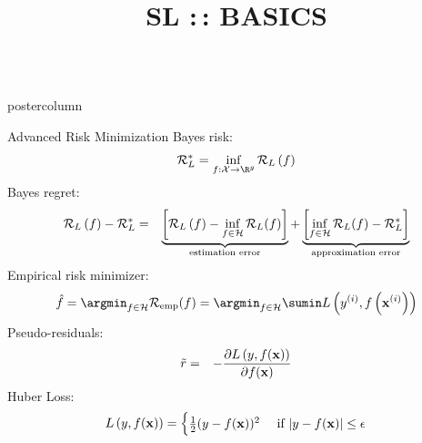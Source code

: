 \documentclass{beamer}
\title{SL :\,: BASICS} %
\newlength{\columnheight} %
\begin{document}
	\begin{frame}[fragile]{}
		\vspace{-8ex}
		\begin{columns}
			\begin{column}{.31\textwidth}
				\begin{beamercolorbox}[center]{postercolumn}
					\begin{minipage}{.98\textwidth}
						\parbox[t][\columnheight]{\textwidth}{
							\begin{myblock}{Advanced Risk Minimization}
								Bayes risk:
								\begin{eqnarray*}
									\riskbayes_{L} = \inf_{f: \Xspace \to \R^g} \risk_L\left(f\right) 
								\end{eqnarray*}
								Bayes regret:
								{\small
								\begin{eqnarray*}
									\mathcal{R}_L\left(f \right) - \mathcal{R}^\ast_{L} &=& \underbrace{\left[\mathcal{R}_L\left( f \right) - \inf_{f \in \mathcal{H}} \mathcal{R}_L(f)\right]}_{\text{estimation error}} + \underbrace{\left[\inf_{f \in \mathcal{H}} \mathcal{R}_L(f) - \mathcal{R}^\ast_{L}\right]}_{\text{approximation error}}
								\end{eqnarray*}}
								Empirical risk minimizer:
								\begin{eqnarray*}
									\hat f = \argmin_{f \in \Hspace} \riskef = \argmin_{f \in \Hspace} \sumin \Lxyi
								\end{eqnarray*}
								Pseudo-residuals:
								\vspace*{-0.3cm}
								\begin{eqnarray*}
									\tilde r &=& - \frac{\partial L\left(y, f(\mathbf{x})\right)}{\partial f(\mathbf{x})}
								\end{eqnarray*}
								Huber Loss:
								$$
									\Lxy = \begin{cases}
												\frac{1}{2}(y - \fx)^2  & \text{ if } |y - \fx| \le \epsilon \\

\end{cases}$$
\end{myblock}}
\end{minipage}
\end{beamercolorbox}
\end{column}
\end{columns}
\end{frame}
\end{document}
